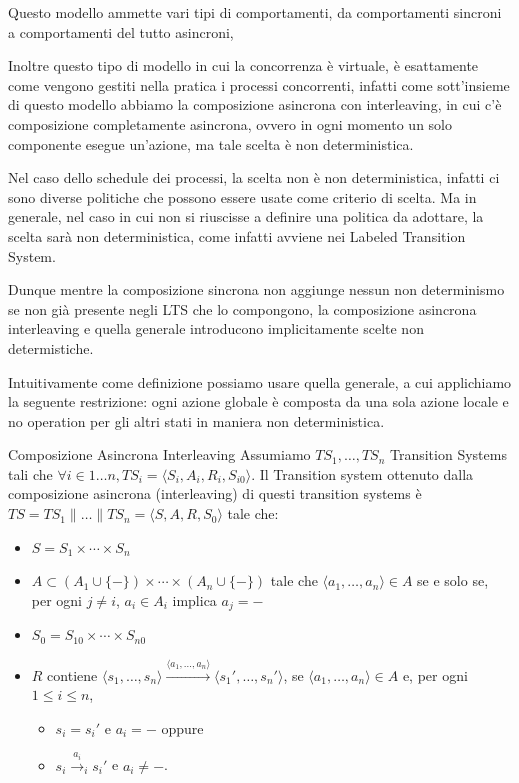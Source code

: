 Questo modello ammette vari tipi di comportamenti, da comportamenti sincroni a comportamenti del tutto asincroni,

Inoltre questo tipo di modello in cui la concorrenza è virtuale, è esattamente come vengono gestiti nella pratica i processi concorrenti, infatti come sott'insieme di questo modello abbiamo la composizione asincrona con interleaving, in cui c'è composizione completamente asincrona, ovvero in ogni momento un solo componente esegue un'azione, ma tale scelta è non deterministica.

Nel caso dello schedule dei processi, la scelta non è non deterministica, infatti ci sono diverse politiche che possono essere usate come criterio di scelta. Ma in generale, nel caso in cui non si riuscisse a definire una politica da adottare, la scelta sarà non deterministica, come infatti avviene nei Labeled Transition System.

Dunque mentre la composizione sincrona non aggiunge nessun non determinismo se non già presente negli LTS che lo compongono, la composizione asincrona interleaving e quella generale introducono implicitamente scelte non determistiche.

Intuitivamente come definizione possiamo usare quella generale, a cui applichiamo la seguente restrizione: ogni azione globale è composta da una sola azione locale e no operation per gli altri stati in maniera non deterministica.


\begin{definition}{Composizione Asincrona Interleaving}
  Assumiamo \(TS_1,\ldots,TS_n\) Transition Systems tali che \(\forall i \in 1\ldots n, TS_i = \langle S_i,A_i,R_i,S_{i0}\rangle \). Il Transition system ottenuto dalla composizione asincrona (interleaving) di questi transition systems è \( TS = TS_1 \parallel \ldots \parallel TS_n = \langle S,A,R,S_0\rangle \) tale che:
  \begin{itemize}
    \item \( S = S_1 \times \cdots \times S_n \)
    \item \( A \subset (A_1 \cup \{-\}) \times \cdots \times (A_n \cup \{-\}) \) tale che \( \langle a_1,\ldots,a_n \rangle \in A \) se e solo se, per ogni \( j \neq i \), \( a_i \in A_i \) implica \( a_j = - \)
    \item \( S_0 = S_{10} \times \cdots \times S_{n0} \)
    \item \( R \) contiene \( \langle s_1,\ldots,s_n \rangle \xrightarrow{\langle a_1,\ldots,a_n \rangle} \langle s_1',\ldots,s_n' \rangle \), se \( \langle a_1,\ldots,a_n \rangle \in A \) e, per ogni \( 1 \leq i \leq n \),
          \begin{itemize}
            \item \( s_i = s_i' \) e \( a_i = - \) oppure
            \item \( s_i \xrightarrow{a_i}_i s_i' \) e \( a_i \neq - \).
          \end{itemize}
  \end{itemize}
\end{definition}

